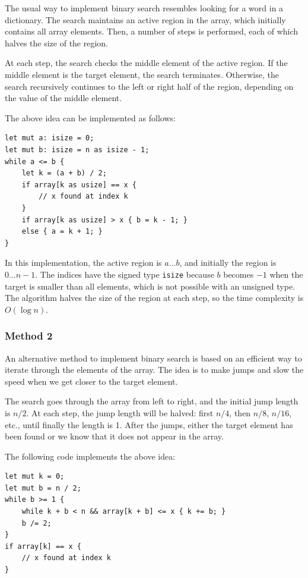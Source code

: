 The usual way to implement binary search
resembles looking for a word in a dictionary.
The search maintains an active region in the array,
which initially contains all array elements.
Then, a number of steps is performed,
each of which halves the size of the region.

At each step, the search checks the middle element
of the active region.
If the middle element is the target element,
the search terminates.
Otherwise, the search recursively continues
to the left or right half of the region,
depending on the value of the middle element.

The above idea can be implemented as follows:
\begin{lstlisting}
let mut a: isize = 0;
let mut b: isize = n as isize - 1;
while a <= b {
    let k = (a + b) / 2;
    if array[k as usize] == x {
        // x found at index k
    }
    if array[k as usize] > x { b = k - 1; }
    else { a = k + 1; }
}
\end{lstlisting}

In this implementation, the active region is $a \ldots b$,
and initially the region is $0 \ldots n-1$.
The indices have the signed type \texttt{isize}
because $b$ becomes $-1$ when the target is smaller
than all elements, which is not possible with an unsigned type.
The algorithm halves the size of the region at each step,
so the time complexity is $O(\log n)$.

\subsubsection{Method 2}

An alternative method to implement binary search
is based on an efficient way to iterate through
the elements of the array.
The idea is to make jumps and slow the speed
when we get closer to the target element.

The search goes through the array from left to
right, and the initial jump length is $n/2$.
At each step, the jump length will be halved:
first $n/4$, then $n/8$, $n/16$, etc., until
finally the length is 1.
After the jumps, either the target element has
been found or we know that it does not appear in the array.

The following code implements the above idea:
\begin{lstlisting}
let mut k = 0;
let mut b = n / 2;
while b >= 1 {
    while k + b < n && array[k + b] <= x { k += b; }
    b /= 2;
}
if array[k] == x {
    // x found at index k
}
\end{lstlisting}

